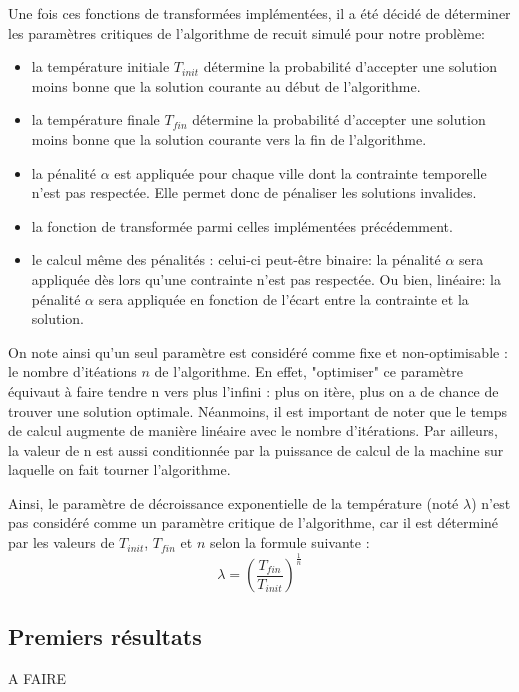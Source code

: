 \documentclass[a4paper, 12pt]{article}
\begin{document}
Une fois ces fonctions de transformées implémentées, il a été décidé de déterminer les paramètres critiques de l'algorithme de recuit simulé pour notre problème:
\begin{itemize}
    \item la température initiale $T_{init}$ détermine la probabilité d'accepter une solution moins bonne que la solution courante au début de l'algorithme.
    \item la température finale $T_{fin}$ détermine la probabilité d'accepter une solution moins bonne que la solution courante vers la fin de l'algorithme.
    \item la pénalité $\alpha$ est appliquée  pour chaque ville dont la contrainte temporelle n'est pas respectée. Elle permet donc de pénaliser les solutions invalides.
    \item la fonction de transformée parmi celles implémentées précédemment.
    \item le calcul même des pénalités : celui-ci peut-être binaire: la pénalité $\alpha$ sera appliquée dès lors qu'une contrainte n'est pas respectée. Ou bien, linéaire: la pénalité $\alpha$ sera appliquée en fonction de l'écart entre la contrainte et la solution.
\end{itemize}

On note ainsi qu'un seul paramètre est considéré comme fixe et non-optimisable : le nombre d'itéations $n$ de l'algorithme. En effet, "optimiser" ce paramètre équivaut à faire tendre n vers plus l'infini : plus on itère, plus on a de chance de trouver une solution optimale. Néanmoins, il est important de noter que le temps de calcul augmente de manière linéaire avec le nombre d'itérations.
Par ailleurs, la valeur de n est aussi conditionnée par la puissance de calcul de la machine sur laquelle on fait tourner l'algorithme.

Ainsi, le paramètre de décroissance exponentielle de la température (noté $\lambda$) n'est pas considéré comme un paramètre critique de l'algorithme, car il est déterminé par les valeurs de $T_{init}$, $T_{fin}$ et $n$ selon la formule suivante :
\[
\lambda = \left( \frac{T_{fin}}{T_{init}} \right)^{\frac{1}{n}}
\]

\subsection{Premiers résultats}
A FAIRE
\end{document}
